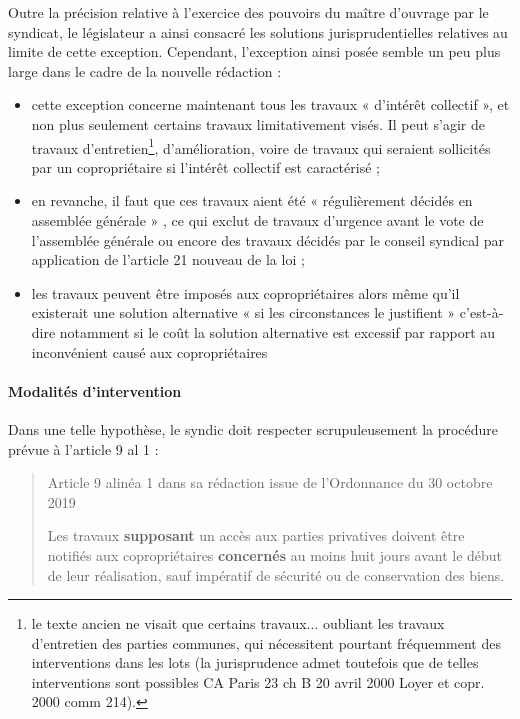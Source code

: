 				Outre la précision relative à l’exercice des pouvoirs du maître d’ouvrage par le syndicat, le législateur a ainsi consacré les solutions jurisprudentielles relatives au limite de cette exception. Cependant, l’exception ainsi posée semble un peu plus large dans le cadre de la nouvelle rédaction :
				\begin{itemize}
					\item cette exception concerne maintenant tous les travaux « d’intérêt collectif », et non plus seulement certains travaux limitativement visés. Il peut s’agir de travaux d’entretien\footnote{le texte ancien ne visait que certains travaux$\dots$ oubliant les travaux d’entretien des parties communes, qui nécessitent pourtant fréquemment des interventions dans les lots (la jurisprudence admet toutefois que de telles interventions sont possibles CA Paris 23 ch B 20 avril 2000 Loyer et copr. 2000 comm 214).}, d’amélioration, voire de travaux qui seraient sollicités par un copropriétaire si l’intérêt collectif est caractérisé ;
					
					\item en revanche, il faut que ces travaux aient été « régulièrement décidés en assemblée générale » , ce qui exclut de travaux d’urgence avant le vote de l’assemblée générale ou encore des travaux décidés par le conseil syndical par application de l’article 21 nouveau de la loi ;
					
					\item les travaux peuvent être imposés aux copropriétaires alors même qu’il existerait une solution alternative « si les circonstances le justifient » c’est-à-dire notamment si le coût la solution alternative est excessif par rapport au inconvénient causé aux copropriétaires
				\end{itemize}
			
			\paragraph{Modalités d’intervention}
			
			Dans une telle hypothèse, le syndic doit respecter scrupuleusement la procédure prévue à l’article 9 al 1 :
			\begin{quote}
				Article 9 alinéa 1 dans sa rédaction issue de l’Ordonnance du 30 octobre 2019
				
				Les travaux \textbf{supposant} un accès aux parties privatives doivent être notifiés aux copropriétaires \textbf{concernés} au moins huit jours avant le début de leur réalisation, sauf impératif de sécurité ou de conservation des biens.
			\end{quote}
			

